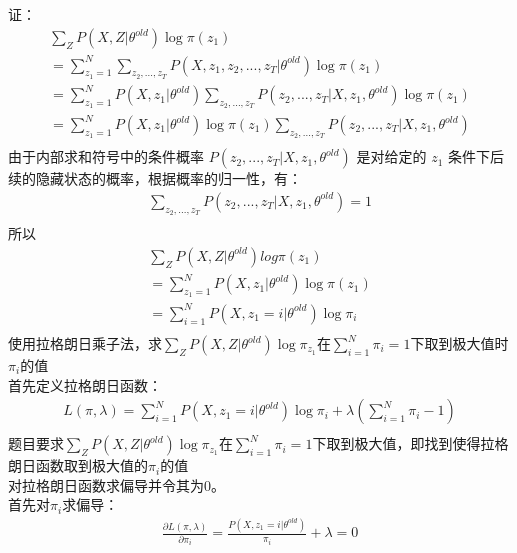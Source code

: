 \documentclass[12pt,a4paper]{article}
\begin{document}
\subsection{}
证：
\begin{gather*}
    \sum_{Z}P(X,Z|\theta^{old})\log\pi(z_1)\\
    = \sum_{z_1=1}^{N}\sum_{z_2,...,z_T}P(X,z_1,z_2,...,z_T|\theta^{old})\log\pi(z_1)\\
    =\sum_{z_1=1}^{N}P(X,z_1|\theta^{old})\sum_{z_2,...,z_T}P(z_2,...,z_T|X,z_1,\theta^{old})\log\pi(z_1)\\
    = \sum_{z_1=1}^{N}P(X,z_1|\theta^{old})\log\pi(z_1)\sum_{z_2,...,z_T}P(z_2,...,z_T|X,z_1,\theta^{old})\\
\end{gather*}
由于内部求和符号中的条件概率 $P(z_2,...,z_T|X,z_1,\theta^{old})$ 是对给定的 $z_1$ 条件下后续的隐藏状态的概率，根据概率的归一性，有：
\begin{gather*}
    \sum_{z_2,...,z_T}P(z_2,...,z_T|X,z_1,\theta^{old}) = 1\\
\end{gather*}
所以
\begin{gather*}
    \sum_{Z}P(X,Z|\theta^{old})log\pi(z_1)\\
    = \sum_{z_1=1}^{N}P(X,z_1|\theta^{old})\log\pi(z_1)\\
    = \sum_{i=1}^{N}P(X,z_1 = i|\theta^{old})\log\pi_i\\
\end{gather*}
使用拉格朗日乘子法，求$\sum_{Z}P(X,Z|\theta^{old})\log\pi_{z_1}$在$\sum_{i=1}^{N}\pi_i = 1$下取到极大值时$\pi_i$的值\\
首先定义拉格朗日函数：
\begin{gather*}
    L(\pi,\lambda) = \sum_{i=1}^{N}P(X,z_1 = i|\theta^{old})\log\pi_i + \lambda(\sum_{i=1}^{N}\pi_i - 1)\\
\end{gather*}
题目要求$\sum_{Z}P(X,Z|\theta^{old})\log\pi_{z_1}$在$\sum_{i=1}^{N}\pi_i = 1$下取到极大值，即找到使得拉格朗日函数取到极大值的$\pi_i$的值\\
对拉格朗日函数求偏导并令其为0。\\
首先对$\pi_i$求偏导：
\begin{gather*}
    \frac{\partial L(\pi,\lambda)}{\partial \pi_i} = \frac{P(X,z_1 = i|\theta^{old})}{\pi_i} + \lambda = 0\\
\end{gather*}
\end{document}

